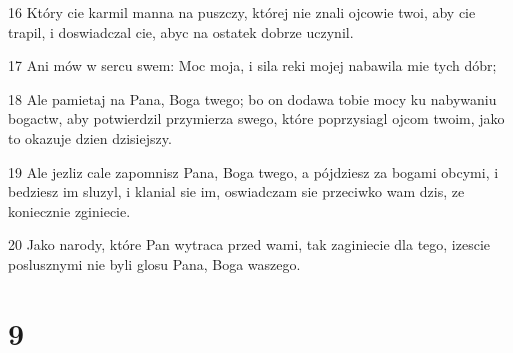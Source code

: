 \par 16 Który cie karmil manna na puszczy, której nie znali ojcowie twoi, aby cie trapil, i doswiadczal cie, abyc na ostatek dobrze uczynil.
\par 17 Ani mów w sercu swem: Moc moja, i sila reki mojej nabawila mie tych dóbr;
\par 18 Ale pamietaj na Pana, Boga twego; bo on dodawa tobie mocy ku nabywaniu bogactw, aby potwierdzil przymierza swego, które poprzysiagl ojcom twoim, jako to okazuje dzien dzisiejszy.
\par 19 Ale jezliz cale zapomnisz Pana, Boga twego, a pójdziesz za bogami obcymi, i bedziesz im sluzyl, i klanial sie im, oswiadczam sie przeciwko wam dzis, ze koniecznie zginiecie.
\par 20 Jako narody, które Pan wytraca przed wami, tak zaginiecie dla tego, izescie poslusznymi nie byli glosu Pana, Boga waszego.

\chapter{9}

